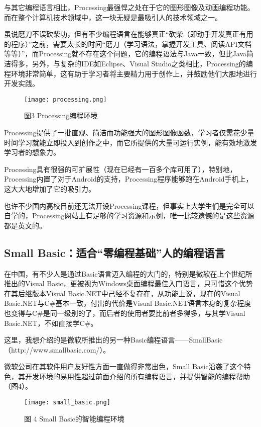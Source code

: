 与其它编程语言相比，Processing最强悍之处在于它的图形图像及动画编程功能。而在整个计算机技术领域中，这一块无疑是最吸引人的技术领域之一。

虽说磨刀不误砍柴功，但有不少编程语言在能够真正“砍柴（即动手开发真正有用的程序）”之前，需要太长的时间“磨刀（学习语法，掌握开发工具、阅读API文档等等）”，而Processing就不存在这个问题，它的编程语法与Java一致，但比Java简洁得多，另外，与复杂的IDE如Eclipse、Visual Studio之类相比，Processing的编程环境非常简单，这有助于学习者将主要精力用于创作上，并鼓励他们大胆地进行开发实践。

\begin{figure}[!h]
\centering
\texttt{[image: processing.png]}
\caption{图3 Processing编程环境}
\label{processing}
\end{figure}

Processing提供了一批直观、简洁而功能强大的图形图像函数，学习者仅需花少量时间学习就能立即投入到创作之中，而它所提供的大量可运行实例，能有效地激发学习者的想象力。

Processing具有很强的可扩展性（现在已经有一百多个库可用了），特别地，Processing内置了对于Android的支持，Processing程序能够跑在Android手机上，这大大地增加了它的吸引力。

也许不少国内高校目前还无法开设Processing课程，但事实上大学生们是完全可以自学的，Processing网站上有足够的学习资源和示例，唯一比较遗憾的是这些资源都是英文的。


\subsection{Small Basic：适合“零编程基础”人的编程语言}

在中国，有不少人是通过Basic语言迈入编程的大门的，特别是微软在上个世纪所推出的Visual Basic，更被视为Windows桌面编程最佳入门语言，只可惜这个优势在其后继版本Visual Basic.NET中己经不复存在，从功能上说，现在的Visual Basic.NET与C\#基本一致，付出的代价是Visual Basic.NET语言本身的复杂程度也变得与C\#是同一级别的了，而后者的使用者要比前者多得多，与其学Visual Basic.NET，不如直接学C\#。

这里，我想介绍的是微软所推出的另一种Basic编程语言——SmallBasic（http://www.smallbasic.com/）。

微软公司在其软件用户友好性方面一直做得非常出色，Small Basic沿袭了这个特色，其开发环境的易用性超过前面介绍的所有编程语言，并提供智能的编程帮助（图4）。

\begin{figure}[!h]
\centering
\texttt{[image: small\_basic.png]}
\caption{图 4 Small Basic的智能编程环境}
\label{small_basic}
\end{figure}

